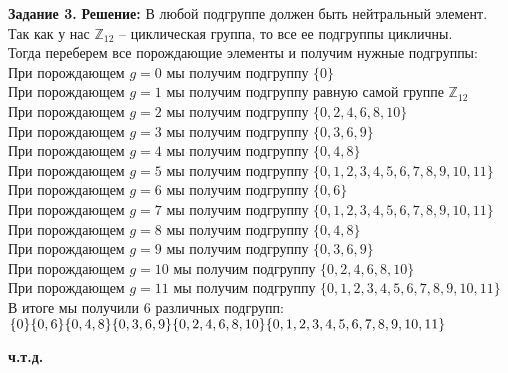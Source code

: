 \documentclass[12pt,a4paper]{scrartcl}
\begin{document}
	\noindent
	\textbf{Задание 3.} 
	\newline
	\textbf{Решение:}
	\newline
	\indent
	В любой подгруппе должен быть нейтральный элемент. \\
	Так как у нас $\mathbb{Z}_{12}$ -- циклическая группа, то все ее подгруппы цикличны. \\
	Тогда переберем все порождающие элементы и получим нужные подгруппы:\\
	При порождающем $g = 0$ мы получим подгруппу $\{0\}$ \\
	При порождающем $g = 1$ мы получим подгруппу равную самой группе $\mathbb{Z}_{12}$ \\
	При порождающем $g = 2$ мы получим подгруппу $\{0, 2, 4, 6, 8, 10\}$ \\
	При порождающем $g = 3$ мы получим подгруппу $\{0, 3, 6, 9\}$ \\
	При порождающем $g = 4$ мы получим подгруппу $\{0, 4, 8\}$ \\
	При порождающем $g = 5$ мы получим подгруппу $\{0, 1, 2, 3, 4, 5, 6, 7, 8, 9, 10, 11\}$ \\
	При порождающем $g = 6$ мы получим подгруппу $\{0, 6\}$ \\
	При порождающем $g = 7$ мы получим подгруппу $\{0, 1, 2, 3, 4, 5, 6, 7, 8, 9, 10, 11\}$ \\
	При порождающем $g = 8$ мы получим подгруппу $\{0, 4, 8\}$ \\	
	При порождающем $g = 9$ мы получим подгруппу $\{0, 3, 6, 9\}$\\
	При порождающем $g = 10$ мы получим подгруппу $\{0, 2, 4, 6, 8, 10\}$ \\
	При порождающем $g = 11$ мы получим подгруппу $\{0, 1, 2, 3, 4, 5, 6, 7, 8, 9, 10, 11\}$ \\
	В итоге мы получили 6 различных подгрупп: \\
	$\{0\} \\
	\{0, 6\} \\
	\{0, 4, 8\} \\
	\{0, 3, 6, 9\}\\
	\{0, 2, 4, 6, 8, 10\}\\
	\{0, 1, 2, 3, 4, 5, 6, 7, 8, 9, 10, 11\}$\\
	\begin{flushright}	
		\textbf{ч.т.д.}
	\end{flushright}
	
\end{document}
